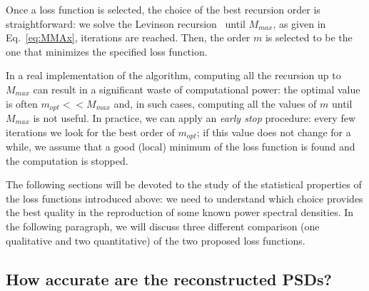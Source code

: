 \documentclass[epj,nopacs]{svjour}
\begin{document}
Once a loss function is selected, the choice of the best recursion order is straightforward: we solve the Levinson recursion~\cite{doi:10.1002/sapm1946251261} until $M_{max}$, as given in Eq.~\eqref{eq:MMAx}, iterations are reached. Then, the order $m$ is selected to be the one that minimizes the specified loss function.

In a real implementation of the algorithm, computing all the recursion up to $M_{max}$ can result in a significant waste of computational power: the optimal value is often $m_{opt} << M_{max}$ and, in such cases, computing all the values of $m$ until $M_{max}$ is not useful.
In practice, we can apply an \textit{early stop} procedure: every few iterations we look for the best order of $m_{opt}$; if this value does not change for a while, we assume that a good (local) minimum of the loss function is found and the computation is stopped.

The following sections will be devoted to the study of the statistical properties of the loss functions introduced above: we need to understand which choice provides the best quality in the reproduction of some known power spectral densities. In the following paragraph, we will discuss three different comparison (one qualitative and two quantitative) of the two proposed loss functions.
\subsection{How accurate are the reconstructed PSDs?}\label{sec:psd_validation}
\end{document}
